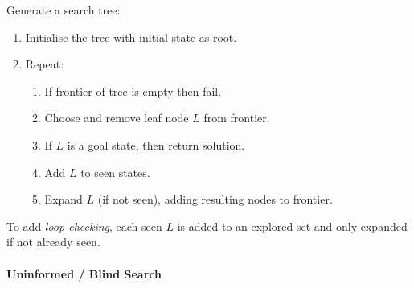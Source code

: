\documentclass[twocolumn,english]{article}
\begin{document}
Generate a search tree:
\begin{enumerate}
\item Initialise the tree with initial state as root.
\item Repeat:
\begin{enumerate}
\item If frontier of tree is empty then fail.
\item Choose and remove leaf node $L$ from frontier.
\item If $L$ is a goal state, then return solution.
\item Add $L$ to seen states.
\item Expand $L$ (if not seen), adding resulting nodes to frontier.
\end{enumerate}
\end{enumerate}
To add \emph{loop checking}, each seen $L$ is added to an explored
set and only expanded if not already seen.

\paragraph{Uninformed / Blind Search}
\end{document}
